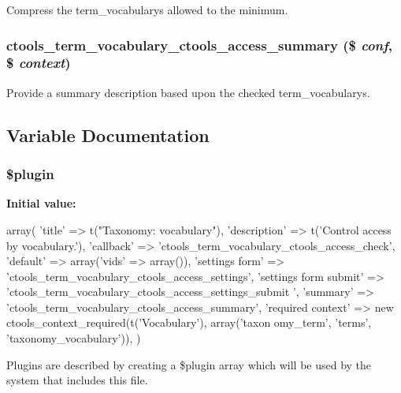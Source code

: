 \label{term__vocabulary_8inc_a1787965aae591062c63fa62fca5ef1c6}
Compress the term\_\-vocabularys allowed to the minimum. \hypertarget{term__vocabulary_8inc_a4801f982fa0a1684d9d339851a63dc62}{
\subsubsection[{ctools\_\-term\_\-vocabulary\_\-ctools\_\-access\_\-summary}]{\setlength{\rightskip}{0pt plus 5cm}ctools\_\-term\_\-vocabulary\_\-ctools\_\-access\_\-summary (\$ {\em conf}, \/  \$ {\em context})}}
\label{term__vocabulary_8inc_a4801f982fa0a1684d9d339851a63dc62}
Provide a summary description based upon the checked term\_\-vocabularys. 

\subsection{Variable Documentation}
\hypertarget{term__vocabulary_8inc_ada8a7130088351710bb02ed622d6bf65}{
\subsubsection[{\$plugin}]{\setlength{\rightskip}{0pt plus 5cm}\$plugin}}
\label{term__vocabulary_8inc_ada8a7130088351710bb02ed622d6bf65}
{\bfseries Initial value:}
\begin{DoxyCode}
 array(
  'title' => t("Taxonomy: vocabulary"),
  'description' => t('Control access by vocabulary.'),
  'callback' => 'ctools_term_vocabulary_ctools_access_check',
  'default' => array('vids' => array()),
  'settings form' => 'ctools_term_vocabulary_ctools_access_settings',
  'settings form submit' => 'ctools_term_vocabulary_ctools_access_settings_submit
      ',
  'summary' => 'ctools_term_vocabulary_ctools_access_summary',
  'required context' => new ctools_context_required(t('Vocabulary'), array('taxon
      omy_term', 'terms', 'taxonomy_vocabulary')),
)
\end{DoxyCode}
Plugins are described by creating a \$plugin array which will be used by the system that includes this file. 